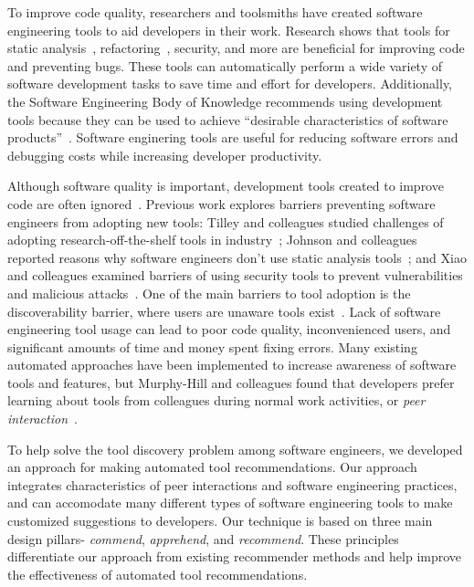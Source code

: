 \documentclass[sigconf,review,anonymous]{acmart}
\begin{document}
To improve code quality, researchers and toolsmiths have created software engineering tools to aid developers in their work. Research shows that tools for static analysis~\cite{UsingStaticAnalysis}, refactoring~\cite{Murphy-HillFitness}, security, and more are beneficial for improving code and preventing bugs. These tools can automatically perform a wide variety of software development tasks to save time and effort for developers. Additionally, the Software Engineering Body of Knowledge recommends using development tools because they can be used to achieve ``desirable characteristics of software products''~\cite{SWEBOK}. Software enginering tools are useful for reducing software errors and debugging costs while increasing developer productivity.

Although software quality is important, development tools created to improve code are often ignored~\cite{Ivanov2017Gaps}. Previous work explores barriers preventing software engineers from adopting new tools: Tilley and colleagues studied challenges of adopting research-off-the-shelf tools in industry~\cite{Tilley2003ROTS}; Johnson and colleagues reported reasons why software engineers don't use static analysis tools~\cite{Johnson2013Why}; and Xiao and colleagues examined barriers of using security tools to prevent vulnerabilities and malicious attacks~\cite{Xiao2014Security}. One of the main barriers to tool adoption is the discoverability barrier, where users are unaware tools exist~\cite{Murphy-HillScreencastingDiscovery}. Lack of software engineering tool usage can lead to poor code quality, inconvenienced users, and significant amounts of time and money spent fixing errors. Many existing automated approaches have been implemented to increase awareness of software tools and features, but Murphy-Hill and colleagues found that developers prefer learning about tools from colleagues during normal work activities, or \textit{peer interaction}~\cite{MurphyHill2011PeerInteraction}.

To help solve the tool discovery problem among software engineers, we developed an approach for making automated tool recommendations. Our approach integrates characteristics of peer interactions and software engineering practices, and can accomodate many different types of software engineering tools to make customized suggestions to developers. Our technique is based on three main design pillars- \textit{commend}, \textit{apprehend}, and \textit{recommend}. These principles differentiate our approach from existing recommender methods and help improve the effectiveness of automated tool recommendations.
\end{document}
